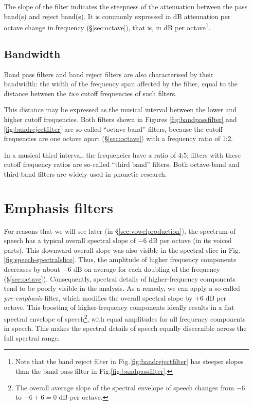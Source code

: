\documentclass[
]{book}
\begin{document}
The slope of the filter indicates the steepness of the attenuation between the pass band(s) and reject band(s). It is commonly expressed in dB attenuation per octave change in frequency (§\ref{sec:octave}), that is, in dB per octave\footnote{Note that the band reject filter in Fig.\ref{fig:bandrejectfilter} has steeper slopes than the band pass filter in Fig.\ref{fig:bandpassfilter}.}.

\subsection{Bandwidth}\label{bandwidth}

Band pass filters and band reject filters are also characterised by their bandwidth: the width of the frequency span affected by the filter, equal to the distance between the \emph{two} cutoff frequencies of such filters.

This distance may be expressed as the musical interval between the lower and higher cutoff frequencies. Both filters shown in Figures \ref{fig:bandpassfilter} and \ref{fig:bandrejectfilter} are so-called ``octave band'' filters, because the cutoff frequencies are one octave apart (§\ref{sec:octave}) with a frequency ratio of 1:2.

In a musical third interval, the frequencies have a ratio of 4:5; filters with these cutoff frequency ratios are so-called ``third band'' filters. Both octave-band and third-band filters are widely used in phonetic research.

\section{Emphasis filters}\label{sec:emphasisfilters}

For reasons that we will see later (in §\ref{sec:vowelproduction}), the spectrum of speech has a typical overall spectral slope of \(-6\) dB per octave (in its voiced parts). This downward overall slope was also visible in the spectral slice in Fig.\ref{fig:speech-spectralslice}. Thus, the amplitude of higher frequency components decreases by about \(-6\) dB on average for each doubling of the frequency (§\ref{sec:octave}).
Consequently, spectral details of higher-frequency components tend to be poorly visible in the analysis. As a remedy, we can apply a so-called \emph{pre-emphasis} filter, which modifies the overall spectral slope by \(+6\) dB per octave. This boosting of higher-frequency components ideally results in a flat spectral envelope of speech\footnote{The overall average slope of the spectral envelope of speech changes from \(-6\) to \(-6+6=0\) dB per octave.}, with equal amplitudes for all frequency components in speech. This makes the spectral details of speech equally discernible across the full spectral range.
\end{document}
